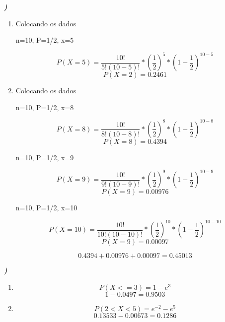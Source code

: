 \documentclass[12pt]{article}
\newcounter{instn}
\newcommand{\instnum}{\arabic{instn}}
\newcommand{\myline}[1]{
    \emph{\textbf{#1)}}
    \addtocounter{instn}{1}
}
\newenvironment{question}
 {
    \myline{\instnum} 
    }
    {
 }
\begin{document}
    \begin{question}
        \begin{enumerate}[label={\textbf{\alph*)}}]
            \item Colocando os dados 
            \begin{center}
                n=10, P=1/2, x=5
            \end{center}      
            \[
                P(X=5) = \frac{10!}{5!(10-5)!} * (\frac{1}{2})^{5}*(1-\frac{1}{2})^{10-5}
            \]
            \begin{equation}
                P(X=2) = 0.2461
            \end{equation}
            \item Colocando os dados 
            \begin{center}
                n=10, P=1/2, x=8
            \end{center}     
            \[
                P(X=8) = \frac{10!}{8!(10-8)!} * (\frac{1}{2})^{8}*(1-\frac{1}{2})^{10-8}
            \]
            \[
                P(X=8) = 0.4394
            \]
            \begin{center}
                n=10, P=1/2, x=9
            \end{center}     
            \[
                P(X=9) = \frac{10!}{9!(10-9)!} * (\frac{1}{2})^{9}*(1-\frac{1}{2})^{10-9}
            \]
            \[
                P(X=9) = 0.00976
            \]
            \begin{center}
                n=10, P=1/2, x=10
            \end{center}     
            \[
                P(X=10) = \frac{10!}{10!(10-10)!} * (\frac{1}{2})^{10}*(1-\frac{1}{2})^{10-10}
            \]
            \[
                P(X=9) = 0.00097
            \]

            \begin{equation}
                0.4394 + 0.00976 + 0.00097 = 0.45013
            \end{equation}
        \end{enumerate}
    \end{question}


    \begin{question}
        \begin{enumerate}[label={\textbf{\alph*)}}]
            \item 
            \[
                P(X <= 3) = 1 - e^{3}   
            \]
            \begin{equation}
                1 - 0.0497 = 0.9503 
            \end{equation}
            \item 
            \[
                P(2 < X < 5) = e^{-2} - e^{5}   
            \]
            \begin{equation}
                0.13533 -0.00673 = 0.1286
            \end{equation}
        \end{enumerate}
    \end{question}
\end{document}
